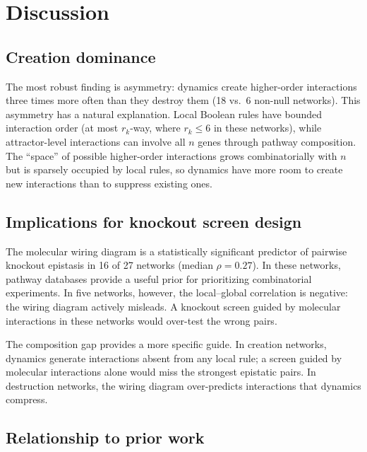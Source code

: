 \documentclass[10pt]{article}
\begin{document}
\section{Discussion}
\label{sec:discussion}

\subsection{Creation dominance}

The most robust finding is asymmetry: dynamics create higher-order
interactions three times more often than they destroy them (18 vs.\ 6
non-null networks). This asymmetry has a natural explanation. Local
Boolean rules have bounded interaction order (at most $r_k$-way,
where $r_k \leq 6$ in these networks), while attractor-level
interactions can involve all $n$ genes through pathway composition.
The ``space'' of possible higher-order interactions grows
combinatorially with $n$ but is sparsely occupied by local rules,
so dynamics have more room to create new interactions than to
suppress existing ones.

\subsection{Implications for knockout screen design}

The molecular wiring diagram is a statistically significant predictor
of pairwise knockout epistasis in 16 of 27 networks (median
$\rho = 0.27$). In these networks, pathway databases provide a
useful prior for prioritizing combinatorial experiments. In five
networks, however, the local--global correlation is negative: the
wiring diagram actively misleads. A knockout screen guided by
molecular interactions in these networks would over-test the
wrong pairs.

The composition gap provides a more specific guide. In creation
networks, dynamics generate interactions absent from any local rule;
a screen guided by molecular interactions alone would miss the
strongest epistatic pairs. In destruction networks, the wiring diagram
over-predicts interactions that dynamics compress.

\subsection{Relationship to prior work}
\end{document}
